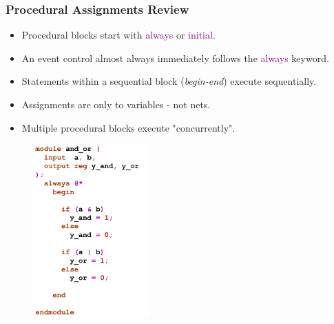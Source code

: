 \documentclass[t, notes, xcolor=table]{beamer}
\begin{document}
\begin{frame}
\frametitle{Procedural Assignments Review}
\scriptsize{
\begin{multicols}{2}
\begin{itemize}
\item Procedural blocks start with \textcolor{purple}{always} or \textcolor{purple}{initial}.
\item An event control almost always immediately follows the \textcolor{purple}{always} keyword.
\item Statements within a sequential block (\textit{begin-end}) execute sequentially.
\item Assignments are only to variables - not nets.
\item Multiple procedural blocks execute "concurrently".
\end{itemize}

\vfill
\columnbreak
\begin{figure}
    \includegraphics[width=0.4\textwidth]{img/08_proc_re.png}
\end{figure}
\end{multicols}
}
\end{frame}
\end{document}
